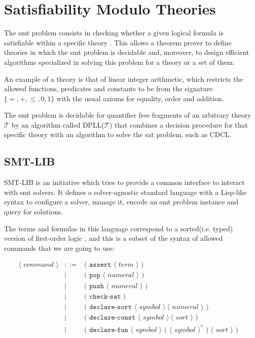 \section{Satisfiability Modulo Theories}

The \gls{smt} problem consists in checking whether a given logical formula is
satisfiable within a specific theory \citep{smtLibStandard}. This allows a 
theorem prover to define theories in which the \gls{smt} problem is decidable
and, moreover, to design efficient algorithms specialized in solving this
problem for a theory or a set of them.

An example of a theory is that of linear integer arithmetic, which restricts the
allowed functions, predicates and constants to be from the signature $\{=, +,
\leq, 0, 1\}$ with the usual axioms for equality, order and addition.

The \gls{smt} problem is decidable for quantifier free fragments of an arbitrary
theory $\mathcal{T}$ by an algorithm called DPLL($\mathcal{T}$) that combines a
decision procedure for that specific theory with an algorithm to solve the
\gls{sat} problem, such as CDCL. 

\subsection{SMT-LIB}
\label{prelim:smtlib}

SMT-LIB is an initiative which tries to provide a common interface to interact
with \acrshort{smt} solvers. It defines a solver-agnostic standard language with
a Lisp-like syntax to configure a solver, manage it, encode an \gls{smt} problem
instance and query for solutions.

The terms and formulas in this language correspond to a sorted(i.e. typed) 
version of first-order logic \citep{smtLibStandard}, and this is a subset 
of the syntax of allowed commands that we are going to use:

\[
\begin{array}{rcll}
\langle\textit{ command }\rangle & ::= & \texttt{( assert } \langle\textit{ term }\rangle\texttt{ ) }\\
& | & \texttt{( pop } \langle\textit{ numeral }\rangle \texttt{ ) }\\
& | & \texttt{( push } \langle\textit{ numeral }\rangle \texttt{ ) }\\
& | & \texttt{( check-sat )}\\
& | & \texttt{( declare-sort } \langle\textit{ symbol }\rangle~\langle\textit{ numeral }\rangle\texttt{ ) }\\
& | & \texttt{( declare-const } \langle\textit{ symbol }\rangle~\langle\textit{ sort }\rangle\texttt{ ) }\\
& | & \texttt{( declare-fun } \langle\textit{ symbol }\rangle \texttt{ ( }\langle\textit{ symbol }\rangle^* \texttt{ ) }\langle\textit{ sort }\rangle\texttt{ ) }\\
\end{array}
\]

